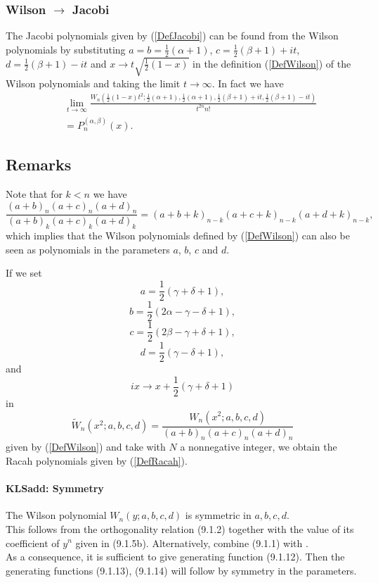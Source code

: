 \documentclass[envcountchap,graybox]{svmono}
\newcounter{rom}
\begin{document}
\subsubsection*{Wilson $\rightarrow$ Jacobi}
The Jacobi polynomials given by (\ref{DefJacobi}) can be found from the Wilson
polynomials by substituting $a=b=\frac{1}{2}(\alpha+1)$, $c=\frac{1}{2}(\beta+1)+it$,
$d=\frac{1}{2}(\beta+1)-it$ and $x\rightarrow t\sqrt{\frac{1}{2}(1-x)}$ in the
definition (\ref{DefWilson}) of the Wilson polynomials and taking the limit
$t\rightarrow\infty$. In fact we have
\begin{eqnarray}
& &\lim_{t\rightarrow\infty}\frac{W_n(\frac{1}{2}(1-x)t^2;\frac{1}{2}(\alpha+1),
\frac{1}{2}(\alpha+1),\frac{1}{2}(\beta+1)+it,\frac{1}{2}(\beta+1)-it)}{t^{2n}n!}\nonumber\\
& &{}=P_n^{(\alpha,\beta)}(x).
\end{eqnarray}

\subsection*{Remarks}
Note that for $k<n$ we have
$$\frac{(a+b)_n(a+c)_n(a+d)_n}{(a+b)_k(a+c)_k(a+d)_k}=(a+b+k)_{n-k}(a+c+k)_{n-k}(a+d+k)_{n-k},$$
which implies that the Wilson polynomials defined by (\ref{DefWilson}) can also be
seen as polynomials in the parameters $a$, $b$, $c$ and $d$.

\noindent
If we set
$$a=\textstyle\frac{1}{2}(\gamma+\delta+1),$$
$$b=\textstyle\frac{1}{2}(2\alpha-\gamma-\delta+1),$$
$$c=\textstyle\frac{1}{2}(2\beta-\gamma+\delta+1),$$
$$d=\textstyle\frac{1}{2}(\gamma-\delta+1),$$
and
$$ix\rightarrow x+\textstyle\frac{1}{2}(\gamma+\delta+1)$$
in
\begin{equation}
{\tilde{W}}_n(x^2;a,b,c,d)=\frac{W_n(x^2;a,b,c,d)}{(a+b)_n(a+c)_n(a+d)_n}
\end{equation}
given by (\ref{DefWilson}) and take
with $N$ a nonnegative integer, we obtain the Racah polynomials given by (\ref{DefRacah}).
%
\paragraph{\large\bf KLSadd: Symmetry}The Wilson polynomial $W_n(y;a,b,c,d)$ is symmetric
in $a,b,c,d$.
\\
This follows from the orthogonality relation (9.1.2)
together with the value of its coefficient of $y^n$ given in (9.1.5b).
Alternatively, combine (9.1.1) with .\\
As a consequence, it is sufficient to give generating function (9.1.12). Then the generating
functions (9.1.13), (9.1.14) will follow by symmetry in the parameters.
%
\end{document}
